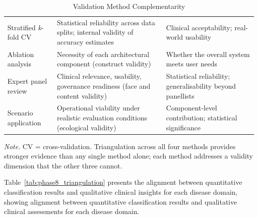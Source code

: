 \begin{table}[!htbp]
\tablestripes
\caption{Validation Method Complementarity}
\tablefontsize
\begin{tabularx}{\textwidth}{@{} >{\raggedright\arraybackslash}p{3.2cm} L L @{}}
\toprule
{} &  &  \\
\midrule
Stratified \textit{k}-fold CV & Statistical reliability across data splits; internal validity of accuracy estimates & Clinical acceptability; real-world usability \\
\addlinespace
Ablation analysis & Necessity of each architectural component (construct validity) & Whether the overall system meets user needs \\
\addlinespace
Expert panel review & Clinical relevance, usability, governance readiness (face and content validity) & Statistical reliability; generalisability beyond panellists \\
\addlinespace
Scenario application & Operational viability under realistic evaluation conditions (ecological validity) & Component-level contribution; statistical significance \\
\bottomrule
\end{tabularx}
\vspace{0.5em}\noindent\textit{Note.} CV = cross-validation. Triangulation across all four methods provides stronger evidence than any single method alone; each method addresses a validity dimension that the other three cannot.
\end{table}
\fi

Table~\ref{tab:phase8_triangulation} presents the alignment between quantitative classification results and qualitative clinical insights for each disease domain, showing alignment between quantitative classification results and qualitative clinical assessments for each disease domain.

